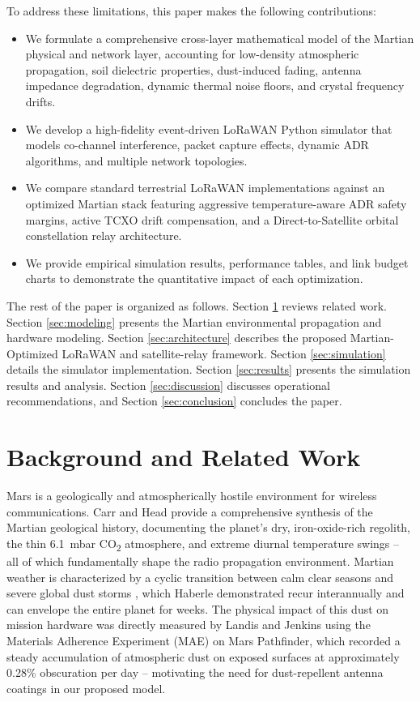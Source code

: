 \documentclass{ijuc}
\begin{document}
To address these limitations, this paper makes the following contributions:
\begin{itemize}
    \item We formulate a comprehensive cross-layer mathematical model of the Martian physical and network layer, accounting for low-density atmospheric propagation, soil dielectric properties, dust-induced fading, antenna impedance degradation, dynamic thermal noise floors, and crystal frequency drifts.
    \item We develop a high-fidelity event-driven LoRaWAN Python simulator that models co-channel interference, packet capture effects, dynamic ADR algorithms, and multiple network topologies.
    \item We compare standard terrestrial LoRaWAN implementations against an optimized Martian stack featuring aggressive temperature-aware ADR safety margins, active TCXO drift compensation, and a Direct-to-Satellite orbital constellation relay architecture.
    \item We provide empirical simulation results, performance tables, and link budget charts to demonstrate the quantitative impact of each optimization.
\end{itemize}

The rest of the paper is organized as follows. Section \ref{sec:related} reviews related work. Section \ref{sec:modeling} presents the Martian environmental propagation and hardware modeling. Section \ref{sec:architecture} describes the proposed Martian-Optimized LoRaWAN and satellite-relay framework. Section \ref{sec:simulation} details the simulator implementation. Section \ref{sec:results} presents the simulation results and analysis. Section \ref{sec:discussion} discusses operational recommendations, and Section \ref{sec:conclusion} concludes the paper.

\section{Background and Related Work}
\label{sec:related}
Mars is a geologically and atmospherically hostile environment for wireless communications. Carr and Head \cite{carr2010mars} provide a comprehensive synthesis of the Martian geological history, documenting the planet's dry, iron-oxide-rich regolith, the thin 6.1~mbar CO\textsubscript{2} atmosphere, and extreme diurnal temperature swings -- all of which fundamentally shape the radio propagation environment. Martian weather is characterized by a cyclic transition between calm clear seasons and severe global dust storms \cite{haberle1986dust}, which Haberle demonstrated recur interannually and can envelope the entire planet for weeks. The physical impact of this dust on mission hardware was directly measured by Landis and Jenkins \cite{landis2000dust} using the Materials Adherence Experiment (MAE) on Mars Pathfinder, which recorded a steady accumulation of atmospheric dust on exposed surfaces at approximately 0.28\% obscuration per day -- motivating the need for dust-repellent antenna coatings in our proposed model.
\end{document}
